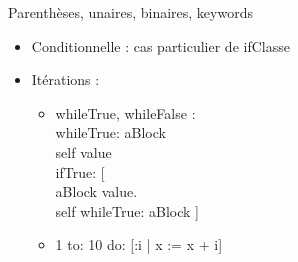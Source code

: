  Parenthèses, unaires, binaires, keywords

\begin{itemize}
	\item Conditionnelle : cas particulier de ifClasse
	\item Itérations :
		\begin{itemize}
			\item whileTrue, whileFalse : \\
				whileTrue: aBlock 
				\\self value
				\\ifTrue: [ 
				\\aBlock value. 
				\\self whileTrue: aBlock ] 
			\item 1 to: 10 do: [:i | x := x + i]
		\end{itemize}
\end{itemize}
